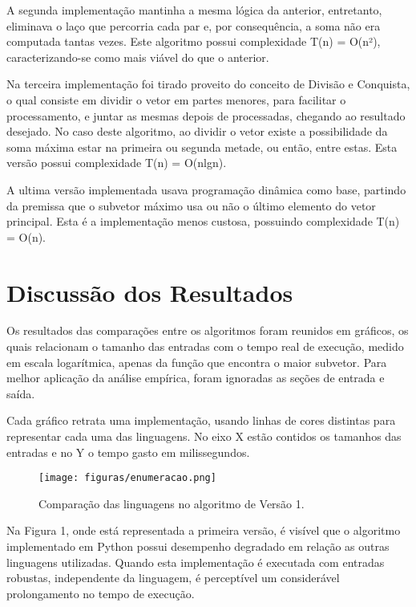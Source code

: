 \documentclass[
	12pt,				%
	oneside,   	        %
	a4paper,			%
	english,			%
	french,				%
	spanish,			%
	brazil,				%
	]{pacotes/abntex2}
\begin{document}
    A segunda implementação mantinha a mesma lógica da anterior, entretanto, eliminava o laço que percorria cada par e, por consequência, a soma não era computada tantas vezes. Este algoritmo possui complexidade T(n) = O(n²), caracterizando-se como mais viável do que o anterior. 
    
    Na terceira implementação foi tirado proveito do conceito de Divisão e Conquista, o qual consiste em dividir o vetor em partes menores, para facilitar o processamento, e juntar as mesmas depois de processadas, chegando ao resultado desejado. No caso deste algoritmo, ao dividir o vetor existe a possibilidade da soma máxima estar na primeira ou segunda metade, ou então, entre estas. Esta versão possui complexidade T(n) = O(nlgn).
    
    A ultima versão implementada usava programação dinâmica como base, partindo da premissa que o subvetor máximo usa ou não o último elemento do vetor principal. Esta é a implementação menos custosa, possuindo complexidade T(n) = O(n).
    
 
\section{Discussão dos Resultados}
\label{sec:discussao}
    
    Os resultados das comparações entre os algoritmos foram reunidos em gráficos, os quais relacionam o tamanho das entradas com o tempo real de execução, medido em escala logarítmica, apenas da função que encontra o maior subvetor. Para melhor aplicação da análise empírica, foram ignoradas as seções de entrada e saída. 
    
    Cada gráfico retrata uma implementação, usando linhas de cores distintas para representar cada uma das linguagens. No eixo X estão contidos os tamanhos das entradas e no Y o tempo gasto em milissegundos.
    
    \begin{figure}[!htb]
      \centering
      \texttt{[image: figuras/enumeracao.png]}
      \caption{Comparação das linguagens no algoritmo de Versão 1.}
      \label{fig:f1}
    \end{figure}
    
    Na Figura 1, onde está representada a primeira versão, é visível que o algoritmo implementado em Python possui desempenho degradado em relação as outras linguagens utilizadas. Quando esta implementação é executada com entradas robustas, independente da linguagem, é perceptível um considerável prolongamento no tempo de execução. 
    
\end{document}
